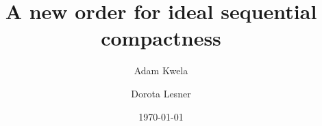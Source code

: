 \documentclass{amsart}
\theoremstyle{plain}
\theoremstyle{definition}
\theoremstyle{remark}
\begin{document}

\title{A new order for ideal sequential compactness}


\author[Adam Kwela]{Adam Kwela}
\address[Adam Kwela]{Institute of Mathematics\\ Faculty of Mathematics\\ Physics and Informatics\\ University of Gda\'{n}sk\\ ul.~Wita  Stwosza 57\\ 80-308 Gda\'{n}sk\\ Poland}

\author[Dorota Lesner]{Dorota Lesner}
\address[Dorota Lesner]{Institute of Mathematics\\ Faculty of Mathematics\\ Physics and Informatics\\ University of Gda\'{n}sk\\ ul.~Wita  Stwosza 57\\ 80-308 Gda\'{n}sk\\ Poland}


\date{\today}





\end{document}
